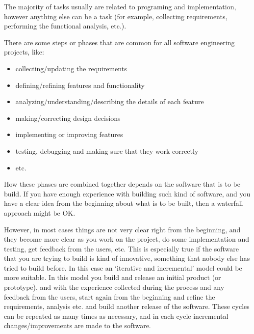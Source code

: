 \documentclass[11pt]{article}
\begin{document}
  The majority of tasks usually are related to programing and
  implementation, however anything else can be a task (for example,
  collecting requirements, performing the functional analysis, etc.).
  
  There are some steps or phases that are common for all software
  engineering projects, like:
\begin{itemize}
\item collecting/updating the requirements
\item defining/refining features and functionality
\item analyzing/understanding/describing the details of each feature
\item making/correcting design decisions
\item implementing or improving features
\item testing, debugging and making sure that they work correctly
\item etc.
\end{itemize}
  
  How these phases are combined together depends on the software that
  is to be build. If you have enough experience with building such
  kind of software, and you have a clear idea from the beginning about
  what is to be built, then a waterfall approach might be OK.

  However, in most cases things are not very clear right from the
  beginning, and they become more clear as you work on the project, do
  some implementation and testing, get feedback from the users,
  etc. This is especially true if the software that you are trying to
  build is kind of innovative, something that nobody else has tried to
  build before. In this case an `iterative and incremental' model could
  be more suitable. In this model you build and release an initial
  product (or prototype), and with the experience collected during the
  process and any feedback from the users, start again from the
  beginning and refine the requirements, analysis etc. and build
  another release of the software. These cycles can be repeated as
  many times as necessary, and in each cycle incremental
  changes/improvements are made to the software.
\end{document}
